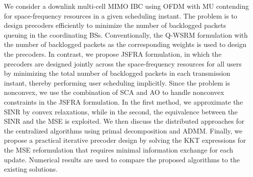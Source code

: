 We consider a downlink multi-cell \ac{MIMO} \ac{IBC} using \ac{OFDM} with \acl{MU} contending for space-frequency resources in a given scheduling instant. The problem is to design precoders efficiently to minimize the number of backlogged packets queuing in the coordinating \acp{BS}. Conventionally, the \ac{Q-WSRM} formulation with the number of backlogged packets as the corresponding weights is used to design the precoders. In contrast, we propose \ac{JSFRA} formulation, in which the precoders are designed jointly across the space-frequency resources for all users by minimizing the total number of backlogged packets in each transmission instant, thereby performing user scheduling implicitly. Since the problem is nonconvex, we use the combination of \ac{SCA} and \ac{AO} to handle nonconvex constraints in the \ac{JSFRA} formulation. In the first method, we approximate the \ac{SINR} by convex relaxations, while in the second, the equivalence between the \ac{SINR} and the \ac{MSE} is exploited. We then discuss the distributed approaches for the centralized algorithms using primal decomposition and \ac{ADMM}. Finally, we propose a practical iterative precoder design by solving the \acl{KKT} expressions for the \ac{MSE} reformulation that requires minimal information exchange for each update. Numerical results are used to compare the proposed algorithms to the existing solutions.
